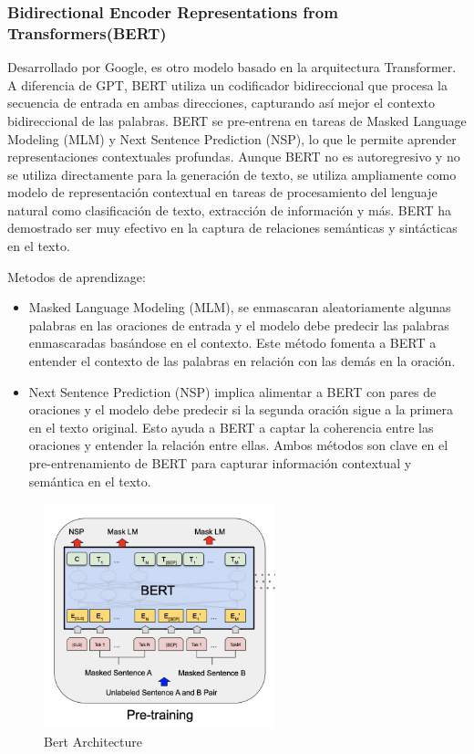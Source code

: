 \subsubsection{Bidirectional Encoder Representations from Transformers(BERT)}

    Desarrollado por Google, es otro modelo basado en la arquitectura Transformer. A diferencia de GPT, BERT utiliza un codificador bidireccional que procesa la secuencia de entrada en ambas direcciones, capturando así mejor el contexto bidireccional de las palabras. BERT se pre-entrena en tareas de Masked Language Modeling (MLM) y Next Sentence Prediction (NSP), lo que le permite aprender representaciones contextuales profundas. Aunque BERT no es autoregresivo y no se utiliza directamente para la generación de texto, se utiliza ampliamente como modelo de representación contextual en tareas de procesamiento del lenguaje natural como clasificación de texto, extracción de información y más. BERT ha demostrado ser muy efectivo en la captura de relaciones semánticas y sintácticas en el texto.

    Metodos de aprendizage:
    \begin{itemize}
        \item Masked Language Modeling (MLM), se enmascaran aleatoriamente algunas palabras en las oraciones de entrada y el modelo debe predecir las palabras enmascaradas basándose en el contexto. Este método fomenta a BERT a entender el contexto de las palabras en relación con las demás en la oración.   
        \item Next Sentence Prediction (NSP) implica alimentar a BERT con pares de oraciones y el modelo debe predecir si la segunda oración sigue a la primera en el texto original. Esto ayuda a BERT a captar la coherencia entre las oraciones y entender la relación entre ellas. Ambos métodos son clave en el pre-entrenamiento de BERT para capturar información contextual y semántica en el texto.
    \end{itemize}
    \begin{figure}[h]
        \centering
        \includegraphics[width=0.6\textwidth]{plantilla-libro/img/bert_architecture.png}
        \caption{Bert Architecture}
        \label{fig:bert}
    \end{figure}
\newpage

